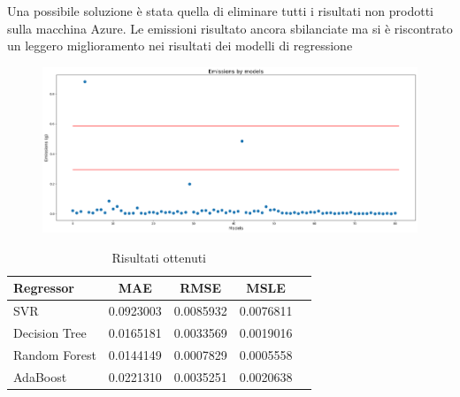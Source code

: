 \noindent Una possibile soluzione è stata quella di eliminare tutti i risultati non prodotti sulla macchina Azure. Le emissioni risultato ancora sbilanciate ma si è riscontrato un leggero miglioramento nei risultati dei modelli di regressione

\begin{figure}[H]
    \centering
    \includegraphics[scale=1]{images/nuova-situazione2.png}
\end{figure}



\begin{table}[H]
    \centering
    \begin{tabular}{|>{\centering\arraybackslash}m{5cm}|c|c|c|c|}
        \hline
        \textbf{Regressor} & \textbf{MAE} & \textbf{RMSE} & \textbf{MSLE} \\ [10pt]
        \hline
        SVR & 0.0923003 & 0.0085932 & 0.0076811 \\ [10pt]
        \hline
        Decision Tree & 0.0165181 & 0.0033569 & 0.0019016 \\ [10pt]
        \hline
        Random Forest & 0.0144149 & 0.0007829 & 0.0005558 \\ [10pt]
        \hline
        AdaBoost & 0.0221310 & 0.0035251 & 0.0020638 \\ [10pt]
        \hline
    \end{tabular}
    \caption*{Risultati ottenuti}
    \label{tab:results}
\end{table}

